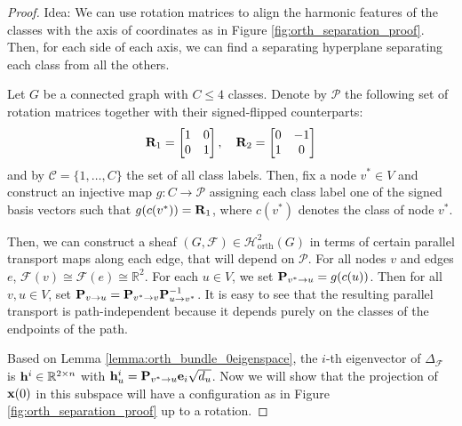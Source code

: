 \documentclass{article}
\def\ve{{\bf{e}}}
\def\vh{{\bf{h}}}
\def\vx{{\bf{x}}}
\def\mP{{\bf{P}}}
\def\mR{{\bf{R}}}
\def\gC{{\mathcal{C}}}
\def\gF{{\mathcal{F}}}
\def\gH{{\mathcal{H}}}
\def\gP{{\mathcal{P}}}
\def\sR{{\mathbb{R}}}
\begin{document}
\begin{proof} Idea: We can use rotation matrices to align the harmonic features of the classes with the axis of coordinates as in Figure \ref{fig:orth_separation_proof}. Then, for each side of each axis, we can find a separating hyperplane separating each class from all the others. 

Let $G$ be a connected graph with $C \leq 4$ classes. Denote by $\gP$ the following set of rotation matrices together with their signed-flipped counterparts:
\begin{align}
    \mR_1 = \begin{bmatrix}
    1 & 0 \\
    0 & 1 \\ 
    \end{bmatrix}
    ,\quad
    \mR_2 = \begin{bmatrix}
    0 & -1 \\
    1 & 0 \\ 
    \end{bmatrix}
\end{align}
and by $\gC = \{ 1, \ldots, C \}$ the set of all class labels. Then, fix a node $v^* \in V$ and construct an injective map $g: C \to \gP$ assigning each class label one of the signed basis vectors such that $g(c(v^*)) = \mR_1$, where $c(v^*)$ denotes the class of node $v^*$. 
 
Then, we can construct a sheaf $(G, \gF) \in \gH^2_{\mathrm{orth}}(G)$ in terms of certain parallel transport maps along each edge, that will depend on $\gP$. For all nodes $v$ and edges $e$, $\gF(v) \cong \gF(e) \cong \sR^2$. For each $u \in V$, we set $\mP_{v^* \to u} = g(c(u))$. Then for all $v, u \in V$, set $\mP_{v \to u} = \mP_{v^* \to v} \mP_{u \to v^*}^{-1}$. It is easy to see that the resulting parallel transport is path-independent because it depends purely on the classes of the endpoints of the path. 

Based on Lemma \ref{lemma:orth_bundle_0eigenspace}, the $i$-th eigenvector of $\Delta_{\gF}$ is $\vh^i \in \sR^{2 \times n}$ with $\vh^i_u = \mP_{v^* \to u} \ve_i \sqrt{d_u}$. Now we will show that the projection of $\vx(0)$ in this subspace will have a configuration as in Figure \ref{fig:orth_separation_proof} up to a rotation.


\end{proof}
\end{document}
